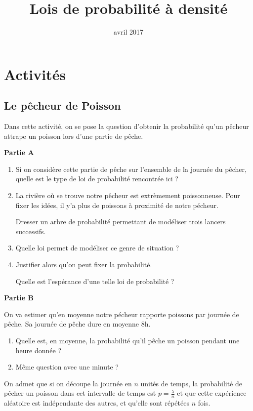 \documentclass[11pt,a4paper,french]{article}
\title{Lois de probabilité à densité}
\author{\bsc{Jumel}}
\date{avril 2017}
\makeatletter
\renewcommand{\maketitle}%
{\framebox{%
    \begin{minipage}{1.0\linewidth}%
      \begin{center}%
        \Large \@title ~-- \@author \\%
        \@date%
      \end{center}%
    \end{minipage}}%
  \normalsize%
}
\theoremstyle{break}
\theoremstyle{plain}
\theoremstyle{nonumberplain}
\theoremstyle{nonumberbreak}
\makeatother
\begin{document}
\noindent\maketitle

\bigskip

\section*{Activités}

\subsection*{Le pêcheur de Poisson}

Dans cette activité, on se pose la question d'obtenir la probabilité
qu'un pêcheur attrape un poisson lors d'une partie de pêche.

\textbf{Partie A}

\begin{enumerate}
  \item Si on considère cette partie de pêche sur l'ensemble de la
    journée du pêcher, quelle est le type de loi de probabilité
    rencontrée ici ?
  \item La rivière où se trouve notre pêcheur est extrèmement
    poissonneuse. Pour fixer les idées, il y'a plus de 
    poissons à proximité de notre pécheur.

    Dresser un arbre de probabilité permettant de modéliser trois
    lancers successifs.
  \item Quelle loi permet de modéliser ce genre de situation ?
  \item Justifier alors qu'on peut fixer la probabilité.

    Quelle est l'espérance d'une telle loi de probabilité ?
\end{enumerate}

\textbf{Partie B}

On va estimer qu'en moyenne notre pécheur rapporte  poissons par
journée de pêche. Sa journée de pêche dure en moyenne 8h.

\begin{enumerate}
  \item Quelle est, en moyenne, la probabilité qu'il pêche un poisson
    pendant une heure donnée ?
  \item Même question avec une minute ?
\end{enumerate}

On admet que si on découpe la journée en $n$ unités de temps, la
probabilité de pêcher un poisson dans cet intervalle de temps est
$p = \frac{\lambda}{n}$ et que cette expérience aléatoire est
indépendante des autres, et qu'elle sont répétées $n$ fois.
\end{document}
